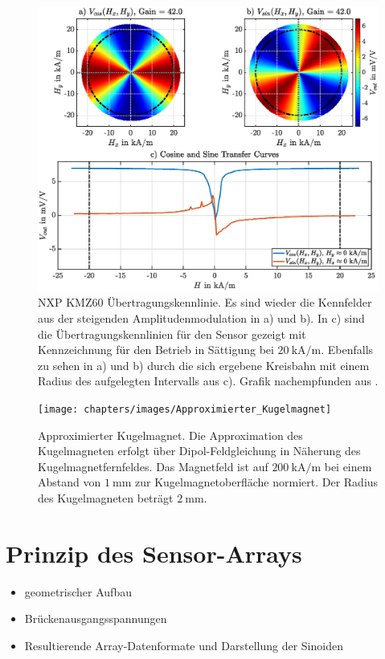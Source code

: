 	
	\clearpage
	\begin{figure}[tbph]
		\centering
		\includegraphics[width=\linewidth]{chapters/images/KMZ60_Uebertragungskennlinien}
		\caption[NXP KMZ60 Übertragungskennlinie]{NXP KMZ60 Übertragungskennlinie. Es sind wieder die Kennfelder aus 
		der steigenden Amplitudenmodulation in a) und b). In c) sind die Übertragungskennlinien für den Sensor gezeigt 
		mit Kennzeichnung für den Betrieb in Sättigung bei $\SI{20}{\kilo\ampere\per\metre}$. Ebenfalls zu sehen in a) 
		und b) durch die sich ergebene Kreisbahn mit einem Radius des aufgelegten Intervalls aus c). Grafik 
		nachempfunden aus \cite{Schuethe2019}.}
		\label{fig:kmz60uebertragungskennlinien}
	\end{figure}

	
	\clearpage
	\begin{figure}[tbph]
		\centering
		\texttt{[image: chapters/images/Approximierter\_Kugelmagnet]}
		\caption[Approximierter Kugelmagnet]{Approximierter Kugelmagnet. Die Approximation des Kugelmagneten erfolgt 
		über Dipol-Feldgleichung in Näherung des Kugelmagnetfernfeldes. Das Magnetfeld ist auf 
		$\SI{200}{\kilo\ampere\per\metre}$ bei einem Abstand von $\SI{1}{\milli\metre}$ zur Kugelmagnetoberfläche 
		normiert. Der Radius des Kugelmagneten beträgt $\SI{2}{\milli\metre}$.}
		\label{fig:dipolemagnet}
	\end{figure}
	
	
	\clearpage
	
	
\section{Prinzip des Sensor-Arrays}\label{sec:prinzip-des-sensor-arrays}
	\begin{itemize}
		\item geometrischer Aufbau
		\item Brückenausgangsspannungen
		\item Resultierende Array-Datenformate und Darstellung der Sinoiden
	\end{itemize}

